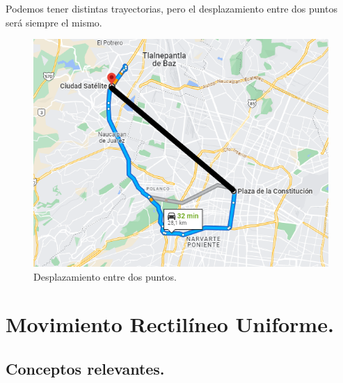 \documentclass[14pt]{extarticle}
\begin{document}
\begin{enumerate}
Podemos tener distintas trayectorias, pero el desplazamiento entre dos puntos será siempre el mismo.
\begin{figure}[H]
    \centering
    \includegraphics[scale=0.45]{Imagenes/Trayectoria_02.png}
    \caption{Desplazamiento entre dos puntos.}
\end{figure}
\end{enumerate}

\section{Movimiento Rectilíneo Uniforme.}

\subsection{Conceptos relevantes.}
\end{document}
